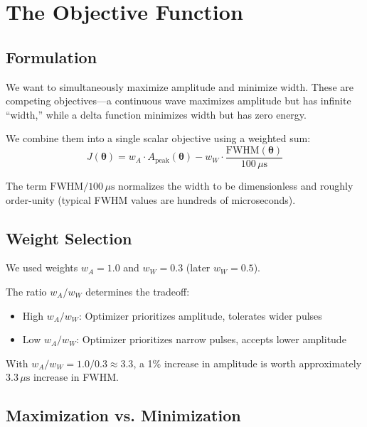 \documentclass[11pt]{article}
\begin{document}
\section{The Objective Function}

\subsection{Formulation}

We want to simultaneously maximize amplitude and minimize width. These are competing objectives---a continuous wave maximizes amplitude but has infinite ``width,'' while a delta function minimizes width but has zero energy.

We combine them into a single scalar objective using a weighted sum:
\begin{equation}
    J(\boldsymbol{\theta}) = w_A \cdot A_{\text{peak}}(\boldsymbol{\theta}) - w_W \cdot \frac{\text{FWHM}(\boldsymbol{\theta})}{100\,\mu\text{s}}
\end{equation}

The term $\text{FWHM}/100\,\mu\text{s}$ normalizes the width to be dimensionless and roughly order-unity (typical FWHM values are hundreds of microseconds).

\subsection{Weight Selection}

We used weights $w_A = 1.0$ and $w_W = 0.3$ (later $w_W = 0.5$).

The ratio $w_A / w_W$ determines the tradeoff:
\begin{itemize}
    \item High $w_A / w_W$: Optimizer prioritizes amplitude, tolerates wider pulses
    \item Low $w_A / w_W$: Optimizer prioritizes narrow pulses, accepts lower amplitude
\end{itemize}

With $w_A / w_W = 1.0 / 0.3 \approx 3.3$, a 1\% increase in amplitude is worth approximately $3.3\,\mu\text{s}$ increase in FWHM.

\subsection{Maximization vs. Minimization}
\end{document}
